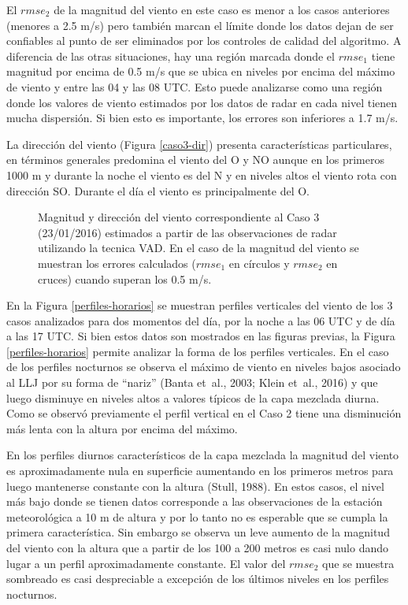 \documentclass[12pt,spanish,oneside, a4paper]{book}
\begin{document}
El \(rmse_2\) de la magnitud del viento en este caso es menor a los
casos anteriores (menores a 2.5 m/s) pero también marcan el límite donde
los datos dejan de ser confiables al punto de ser eliminados por los
controles de calidad del algoritmo. A diferencia de las otras
situaciones, hay una región marcada donde el \(rmse_1\) tiene magnitud
por encima de 0.5 m/s que se ubica en niveles por encima del máximo de
viento y entre las 04 y las 08 UTC. Esto puede analizarse como una
región donde los valores de viento estimados por los datos de radar en
cada nivel tienen mucha dispersión. Si bien esto es importante, los
errores son inferiores a 1.7 m/s.

La dirección del viento (Figura \ref{caso3-dir}) presenta
características particulares, en términos generales predomina el viento
del O y NO aunque en los primeros 1000 m y durante la noche el viento es
del N y en niveles altos el viento rota con dirección SO. Durante el día
el viento es principalmente del O.

\begin{figure}
\newline{}\caption{Magnitud y dirección del viento  correspondiente al Caso 3 (23/01/2016) estimados a partir de las observaciones de radar utilizando la tecnica VAD. En el caso de la magnitud del viento se muestran los errores calculados ($rmse_1$ en círculos y $rmse_2$ en cruces) cuando superan los 0.5 m/s. \label{campo-caso3}}\label{fig:campo-caso3}
\end{figure}

En la Figura \ref{perfiles-horarios} se muestran perfiles verticales del
viento de los 3 casos analizados para dos momentos del día, por la noche
a las 06 UTC y de día a las 17 UTC. Si bien estos datos son mostrados en
las figuras previas, la Figura \ref{perfiles-horarios} permite analizar
la forma de los perfiles verticales. En el caso de los perfiles
nocturnos se observa el máximo de viento en niveles bajos asociado al
LLJ por su forma de ``nariz'' (Banta et~al., 2003; Klein et~al., 2016) y
que luego disminuye en niveles altos a valores típicos de la capa
mezclada diurna. Como se observó previamente el perfil vertical en el
Caso 2 tiene una disminución más lenta con la altura por encima del
máximo.

En los perfiles diurnos característicos de la capa mezclada la magnitud
del viento es aproximadamente nula en superficie aumentando en los
primeros metros para luego mantenerse constante con la altura (Stull,
1988). En estos casos, el nivel más bajo donde se tienen datos
corresponde a las observaciones de la estación meteorológica a 10 m de
altura y por lo tanto no es esperable que se cumpla la primera
característica. Sin embargo se observa un leve aumento de la magnitud
del viento con la altura que a partir de los 100 a 200 metros es casi
nulo dando lugar a un perfil aproximadamente constante. El valor del
\(rmse_2\) que se muestra sombreado es casi despreciable a excepción de
los últimos niveles en los perfiles nocturnos.
\end{document}
